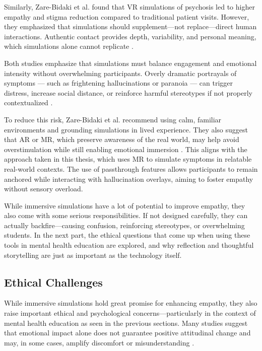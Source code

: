 Similarly, Zare-Bidaki et al. found that VR simulations of psychosis led to higher empathy and stigma reduction compared to traditional patient visits. However, they emphasized that simulations should supplement—not replace—direct human interactions. Authentic contact provides depth, variability, and personal meaning, which simulations alone cannot replicate \cite{Zare-Bidaki2022, Hsia2022}.

Both studies emphasize that simulations must balance engagement and emotional intensity without overwhelming participants. Overly dramatic portrayals of symptoms — such as frightening hallucinations or paranoia — can trigger distress, increase social distance, or reinforce harmful stereotypes if not properly contextualized \cite{Ando2011, Chaffin2013, Zare-Bidaki2022}.

To reduce this risk, Zare-Bidaki et al. recommend using calm, familiar environments and grounding simulations in lived experience. They also suggest that AR or MR, which preserve awareness of the real world, may help avoid overstimulation while still enabling emotional immersion \cite{Zare-Bidaki2022}. This aligns with the approach taken in this thesis, which uses MR to simulate symptoms in relatable real-world contexts. The use of passthrough features allows participants to remain anchored while interacting with hallucination overlays, aiming to foster empathy without sensory overload.

While immersive simulations have a lot of potential to improve empathy, they also come with some serious responsibilities. If not designed carefully, they can actually backfire—causing confusion, reinforcing stereotypes, or overwhelming students. In the next part, the ethical questions that come up when using these tools in mental health education are explored, and why reflection and thoughtful storytelling are just as important as the technology itself.

\subsection{Ethical Challenges}

While immersive simulations hold great promise for enhancing empathy, they also raise important ethical and psychological concerns—particularly in the context of mental health education as seen in the previous sections. Many studies suggest that emotional impact alone does not guarantee positive attitudinal change and may, in some cases, amplify discomfort or misunderstanding \cite{Ando2011}.

